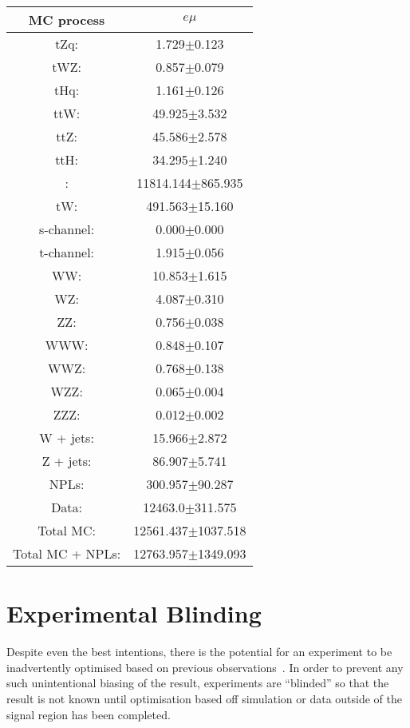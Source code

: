 \begin{table}[htbp]
\label{tab:ttbarCR}
  \centering
 \begin{tabular}{cc}
   \hline
   \textbf{MC process} & \textbf{$e\mu$}  \\
   \hline
	tZq\@: & 1.729$\pm$0.123  \\
	tWZ\@: & 0.857$\pm$0.079  \\
	tHq\@: & 1.161$\pm$0.126  \\
	ttW\@: & 49.925$\pm$3.532   \\
	ttZ\@: & 45.586$\pm$2.578   \\
	ttH\@: & 34.295$\pm$1.240  \\
	\ttbar: & 11814.144$\pm$865.935   \\
	tW\@: & 491.563$\pm$15.160   \\
	s-channel\@: &  0.000$\pm$0.000 \\
	t-channel\@: & 1.915$\pm$0.056 \\
	WW\@: & 10.853$\pm$1.615  \\
	WZ\@: & 4.087$\pm$0.310 \\
	ZZ\@: & 0.756$\pm$0.038 \\
	WWW\@: & 0.848$\pm$0.107     \\
	WWZ\@: & 0.768$\pm$0.138     \\
	WZZ\@: & 0.065$\pm$0.004     \\
	ZZZ\@: & 0.012$\pm$0.002     \\
	W + jets\@: & 15.966$\pm$2.872     \\
	Z + jets\@: & 86.907$\pm$5.741     \\
	NPLs\@: & 300.957$\pm$90.287     \\
	\hline
	Data\@: & 12463.0$\pm$311.575     \\
	\hline
	Total MC\@: & 12561.437$\pm$1037.518     \\
	Total MC + NPLs\@: & 12763.957$\pm$1349.093     \\
   \hline
 \end{tabular}
\end{table}

\section{Experimental Blinding}\label{sec:blinding}
Despite even the best intentions, there is the potential for an experiment to be inadvertently optimised based on previous observations~\cite{Roodman:2003rw}.
In order to prevent any such unintentional biasing of the result, experiments are ``blinded'' so that the result is not known until optimisation based off simulation or data outside of the signal region has been completed.

